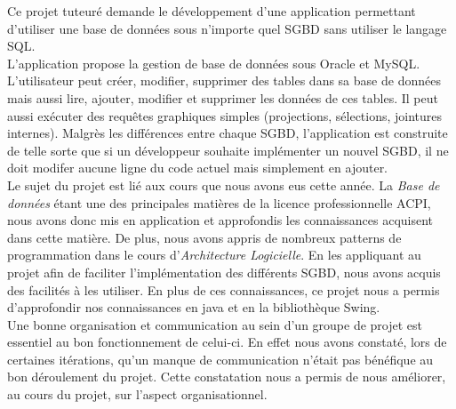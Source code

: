 Ce projet tuteuré demande le développement d’une application permettant d’utiliser une base de données sous n'importe quel SGBD sans utiliser le langage SQL.\\

L'application propose la gestion de base de données sous Oracle et MySQL. L'utilisateur peut créer, modifier, supprimer des tables dans sa base de données mais aussi lire, ajouter, modifier et supprimer les données de ces tables. Il peut aussi exécuter des requêtes graphiques simples (projections, sélections, jointures internes). Malgrès les différences entre chaque SGBD, l'application est construite de telle sorte que si un développeur souhaite implémenter un nouvel SGBD, il ne doit modifer aucune ligne du code actuel mais simplement en ajouter.\\

Le sujet du projet est lié aux cours que nous avons eus cette année. La \textit{Base de données} étant une des principales matières de la licence professionnelle ACPI, nous avons donc mis en application et approfondis les connaissances acquisent dans cette matière. De plus, nous avons appris de nombreux patterns de programmation dans le cours d'\textit{Architecture Logicielle}. En les appliquant au projet afin de faciliter l'implémentation des différents SGBD, nous avons acquis des facilités à les utiliser. En plus de ces connaissances, ce projet nous a permis d'approfondir nos connaissances en java et en la bibliothèque Swing. \\

Une bonne organisation et communication au sein d'un groupe de projet est essentiel au bon fonctionnement de celui-ci. En effet nous avons constaté, lors de certaines itérations, qu'un manque de communication n'était pas bénéfique au bon déroulement du projet. Cette constatation nous a permis de nous améliorer, au cours du projet, sur l'aspect organisationnel.